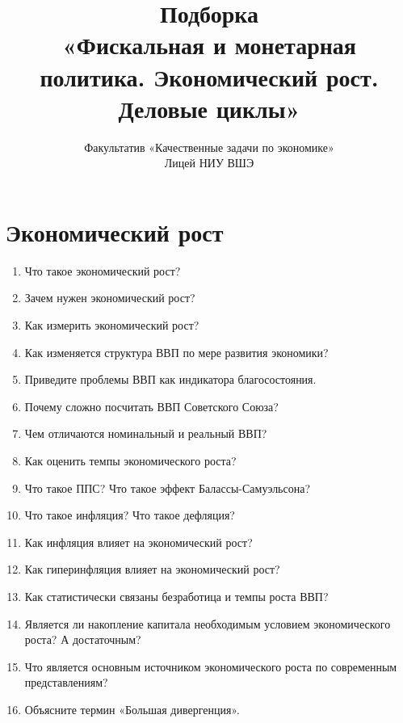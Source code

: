 \documentclass[10pt, a4paper]{extarticle}
\title{Подборка \\ «Фискальная и монетарная политика. Экономический рост. Деловые циклы»}
\author{Факультатив «Качественные задачи по экономике» \\ Лицей НИУ ВШЭ}
\begin{document}
\maketitle

\section{Экономический рост}
\begin{enumerate}
	\item Что такое экономический рост? 
	\item Зачем нужен экономический рост?
	\item Как измерить экономический рост? 
	\item Как изменяется структура ВВП по мере развития экономики? 
	\item Приведите проблемы ВВП как индикатора благосостояния.
	\item Почему сложно посчитать ВВП Советского Союза? 
	\item Чем отличаются номинальный и реальный ВВП?
	\item Как оценить темпы экономического роста? 
	\item Что такое ППС? Что такое эффект Балассы-Самуэльсона? 
	\item Что такое инфляция? Что такое дефляция?
	\item Как инфляция влияет на экономический рост? 
	\item Как гиперинфляция влияет на экономический рост? 
	\item Как статистически связаны безработица и темпы роста ВВП?
	\item Является ли накопление капитала необходимым условием экономического роста? А достаточным?
	\item Что является основным источником экономического роста по современным представлениям?
	\item Объясните термин «Большая дивергенция». 
\end{enumerate}
\end{document}
